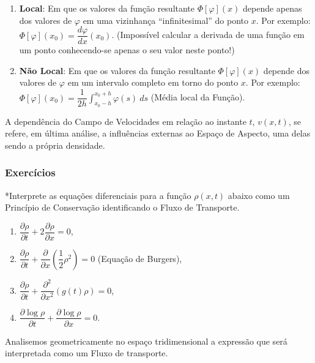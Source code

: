 {\begin{enumerate}
\item \textbf{Local}: Em que os valores da função resultante \(\Phi[\varphi](x)\) depende apenas dos valores de \(\varphi\) em uma vizinhança ``infinitesimal'' do ponto \(x\). Por exemplo: \(\Phi[\varphi](x_0) = \dfrac{d\varphi}{dx}(x_0)\). (Impossível calcular a derivada de uma função em um ponto conhecendo-se apenas o seu valor neste ponto!)

\item \textbf{Não Local}: Em que os valores da função resultante \(\Phi[\varphi](x)\) depende dos valores de \(\varphi\) em um intervalo completo em torno do ponto \(x\). Por exemplo: \(\Phi[\varphi](x_0) = \dfrac{1}{2h} \displaystyle\int_{x_0-h}^{x_0+h} \varphi(s)\ ds\) (Média local da Função).
\end{enumerate}

A dependência do Campo de Velocidades em relação ao instante \(t\), \(v(x,t)\), se refere, em última análise, a influências externas ao Espaço de Aspecto, uma delas sendo a própria densidade.
}


{\small\color{blue}
\subsubsection*{Exercícios}

\begin{exercise}
*Interprete as equações diferenciais para a função \(\rho(x,t)\) abaixo como um Princípio de Conservação identificando o Fluxo de Transporte.

\begin{enumerate}
\item \(\dfrac{\partial \rho}{\partial t} + 2 \dfrac{\partial \rho}{\partial x} = 0\),
\item \(\dfrac{\partial \rho}{\partial t} + \dfrac{\partial}{\partial x} \left(\dfrac{1}{2}\rho^2\right) = 0\) (Equação de Burgers),
\item \(\dfrac{\partial \rho}{\partial t} + \dfrac{\partial^2}{\partial x^2} \left(g(t)\rho\right) = 0\),
\item \(\dfrac{\partial \log\rho}{\partial t} + \dfrac{\partial \log\rho}{\partial x} = 0\).
\end{enumerate}
\end{exercise}
}

Analisemos geometricamente no espaço tridimensional a expressão que será interpretada como um Fluxo de transporte.

